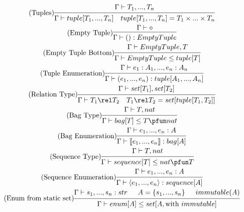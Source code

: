 \documentclass{article}
\newcommand{\ruleSpace}{\ \ \ }
\begin{document}
\begin{gather}
\tag{Tuples}
\begin{prooftree}
\hypo{\Gamma \vdash T_1, ..., T_n}
\infer1{\Gamma \vdash tuple[T_1, ..., T_n] \ruleSpace tuple[T_1, ..., T_n] = T_1 \times ... \times T_n}
\end{prooftree}
\\
\tag{Empty Tuple}
\begin{prooftree}
\hypo{\Gamma \vdash \diamond}
\infer1{\Gamma \vdash (): EmptyTuple}
\end{prooftree}
\\
\tag{Empty Tuple Bottom}
\begin{prooftree}
\hypo{\Gamma \vdash EmptyTuple, T}
\infer1{\Gamma \vdash EmptyTuple \leq tuple[T]}
\end{prooftree}
\\
\tag{Tuple Enumeration}
\begin{prooftree}
\hypo{\Gamma \vdash e_1:A_1, ..., e_n: A_n}
\infer1{\Gamma \vdash ( e_1, ..., e_n ) : tuple[A_1, ..., A_n]}
\end{prooftree}
\\
\tag{Relation Type}
\begin{prooftree}
\hypo{\Gamma \vdash set[T_1], set[T_2]}
\infer1{\Gamma \vdash T_1 \rel T_2 \ruleSpace T_1 \rel T_2 = set[tuple[T_1, T_2]]}
\end{prooftree}
\\
\tag{Bag Type}
\begin{prooftree}
\hypo{\Gamma \vdash T, nat}
\infer1{\Gamma \vdash bag[T] \leq T \pfun nat }
\end{prooftree}
\\
\tag{Bag Enumeration}
\begin{prooftree}
\hypo{\Gamma \vdash e_1, ..., e_n: A}
\infer1{\Gamma \vdash \llbracket e_1, ..., e_n \rrbracket: bag[A]}
\end{prooftree}
\\
\tag{Sequence Type}
\begin{prooftree}
\hypo{\Gamma \vdash T, nat}
\infer1{\Gamma \vdash sequence[T] \leq nat \pfun T }
\end{prooftree}
\\
\tag{Sequence Enumeration}
\begin{prooftree}
\hypo{\Gamma \vdash e_1, ..., e_n: A}
\infer1{\Gamma \vdash \langle e_1, ..., e_n \rangle : sequence[A]}
\end{prooftree}
\\
\tag{Enum from static set}
\begin{prooftree}
\hypo{\Gamma \vdash s_1, ..., s_n : str}
\hypo{A = \{s_1, ..., s_n\} }
\hypo{immutable(A)}
\infer3{\Gamma \vdash enum[A] \leq set[A, \text{with } immutable]}
\end{prooftree}
\end{gather}
\end{document}
